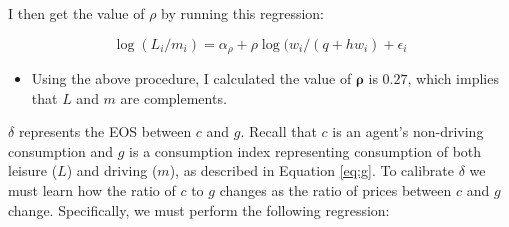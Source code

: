 \documentclass[letter, 12pt, epsf,leqno]{article}
\begin{document}
I then get the value of $\rho$ by running this regression:

\begin{equation} \log(L_i/m_i) = \alpha_\rho + \rho  \log(w_i/(q+hw_i)+\epsilon_i\end{equation}






\begin{itemize}
\item Using the above procedure, I calculated the value of $\boldsymbol{\rho}$ is $\boldsymbol{0.27}$, which implies that $L$ and $m$ are complements.%
\end{itemize}

$\delta$ represents the EOS between $c$ and $g$.  Recall that $c$ is an agent's non-driving consumption and $g$ is a consumption index representing consumption of both leisure ($L$) and driving ($m$), as described in Equation \ref{eq:g}.  To calibrate $\delta$ we must learn how the ratio of $c$ to $g$ changes as the ratio of prices between $c$ and $g$ change.  Specifically, we must perform the following regression:
\end{document}
